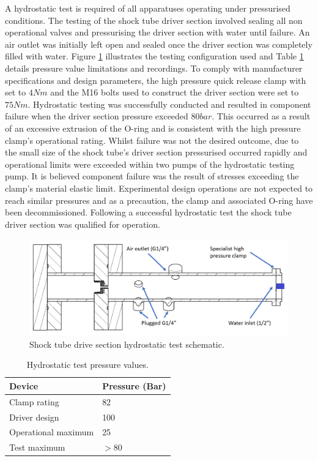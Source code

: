 A hydrostatic test is required of all apparatuses operating under pressurised conditions. The testing of the shock tube driver section involved sealing all non operational valves and pressurising the driver section with water until failure. An air outlet was initially left open and sealed once the driver section was completely filled with water. Figure \ref{fig:hydro_test} illustrates the testing configuration used and Table \ref{tab:hydro} details pressure value limitations and recordings. To comply with manufacturer specifications and design parameters, the high pressure quick release clamp with set to $4Nm$ and the M16 bolts used to construct the driver section were set to $75Nm$. Hydrostatic testing was successfully conducted and resulted in component failure when the driver section pressure exceeded $80bar$. This occurred as a result of an excessive extrusion of the O-ring and is consistent with the high pressure clamp's operational rating. Whilst failure was not the desired outcome, due to the small size of the shock tube's driver section pressurised occurred rapidly and operational limits were exceeded within two pumps of the hydrostatic testing pump. It is believed component failure was the result of stresses exceeding the clamp's material elastic limit. Experimental design operations are not expected to reach similar pressures and as a precaution, the clamp and associated O-ring have been decommissioned. Following a successful hydrostatic test the shock tube driver section was qualified for operation.

\begin{figure}[H] 
	\centering
	\includegraphics[width=1\textwidth]{hydro_test.png} 
	\caption{Shock tube drive section hydrostatic test schematic.}
	\label{fig:hydro_test}
\end{figure}

\begin{table}[H]
\centering
\caption{Hydrostatic test pressure values.}
\label{tab:hydro}
\begin{tabular}{@{}ll@{}}
\toprule
Device              & Pressure (Bar) \\ \midrule
Clamp rating        & 82             \\
Driver design       & 100            \\
Operational maximum & 25             \\
Test maximum        & $>80$          \\ \bottomrule
\end{tabular}
\end{table}



